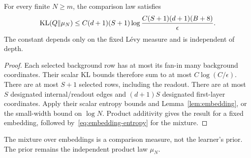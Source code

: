 \begin{lemma}\label{lem:entropy}
For every finite $N\ge m$, the comparison law satisfies
\begin{equation}
 \operatorname{KL}(Q\|\mu_N)
 \le C(d+1)(S+1)
       \log\frac{C(S+1)(d+1)(B+8)}{\epsilon}.
 \label{eq:comparison-entropy}
\end{equation}
The constant depends only on the fixed L\'evy measure and is independent of depth.
\end{lemma}
\begin{proof}
Each selected background row has at most its fan-in many background coordinates. Their scalar KL bounds therefore sum to at most $C\log(C/\epsilon)$. There are at most $S+1$ selected rows, including the readout. There are at most $S$ designated internal/readout edges and $(d+1)S$ designated first-layer coordinates. Apply their scalar entropy bounds and Lemma~\ref{lem:embedding}, or the small-width bound on $\log N$. Product additivity gives the result for a fixed embedding, followed by~\eqref{eq:embedding-entropy} for the mixture.
\end{proof}

The mixture over embeddings is a comparison measure, not the learner's prior. The prior remains the independent product law $\mu_N$.
